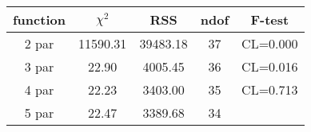 \begin{tabular}{c|c|c|c|c}
function & $\chi^2$ & RSS & ndof & F-test \\
\hline
2 par & 11590.31 & 39483.18 & 37 & CL=0.000 \\
3 par & 22.90 & 4005.45 & 36 & CL=0.016 \\
4 par & 22.23 & 3403.00 & 35 & CL=0.713 \\
5 par & 22.47 & 3389.68 & 34 & \\
\hline
\end{tabular}